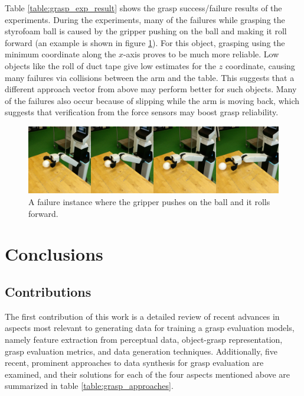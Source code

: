 \documentclass[runningheads]{../llncs}
\begin{document}
Table \ref{table:grasp_exp_result} shows the grasp success/failure results of the experiments. During the experiments,
many of the failures while grasping the styrofoam ball is caused by the gripper pushing on the ball and making it roll
forward (an example is shown in figure \ref{fig:grasp_ball_fail}). For this object, grasping using the minimum
coordinate along the $ x $-axis proves to be much more reliable. Low objects like the roll of duct tape give low
estimates for the $ z $ coordinate, causing many failures via collisions between the arm and the table. This suggests
that a different approach vector from above may perform better for such objects. Many of the failures also occur
because of slipping while the arm is moving back, which suggests that verification from the force sensors may boost
grasp reliability.

\begin{figure}[h!]
    \centering
    \includegraphics[width=\textwidth]{grasp_ball_fail}
    \caption{A failure instance where the gripper pushes on the ball and it rolls forward.}
    \label{fig:grasp_ball_fail}
\end{figure}

\section{Conclusions}

\subsection{Contributions}
The first contribution of this work is a detailed review of recent advances in aspects most relevant to generating data
for training a grasp evaluation models, namely feature extraction from perceptual data, object-grasp representation,
grasp evaluation metrics, and data generation techniques. Additionally, five recent, prominent approaches to data
synthesis for grasp evaluation are examined, and their solutions for each of the four aspects mentioned above are
summarized in table \ref{table:grasp_approaches}.
\end{document}
